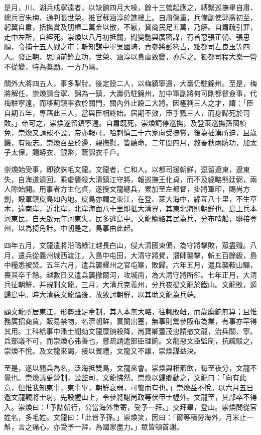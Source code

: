 \begin{pinyinscope}
是月，川、湖兵戍寧遠者，以缺餉四月大噪，餘十三營起應之，縛繫巡撫畢自肅、總兵官朱梅、通判張世榮、推官蘇涵淳於譙樓上。自肅傷重，兵備副使郭廣初至，躬翼自肅，括撫賞及朋椿二萬金以散，不厭，貸商民足五萬，乃解。自肅疏引罪，走中左所，自經死。崇煥以八月初抵關，聞變馳與廣密謀，宥首惡張正朝、張思順，令捕十五人戮之市；斬知謀中軍吳國琦，責參將彭簪古，黜都司左良玉等四人。發正朝、思順前鋒立功，世榮、涵淳以貪虐致變，亦斥之。獨都司程大樂一營不從變，特為獎勵。一方乃靖。

關外大將四五人，事多掣肘。後定設二人，以梅鎮寧遠，大壽仍駐錦州。至是，梅將解任，崇煥請合寧、錦為一鎮，大壽仍駐錦州，加中軍副將何可剛都督僉事，代梅駐寧遠，而移薊鎮率教於關門，關內外止設二大將。因極稱三人之才，謂：「臣自期五年，專藉此三人，當與臣相終始。屆期不效，臣手戮三人，而身歸死於司敗。」帝可之，崇煥遂留鎮寧遠。自肅既死，崇煥請停巡撫，及登萊巡撫孫國楨免，崇煥又請罷不設。帝亦報可。哈剌慎三十六家向受撫賞，後為插漢所迫，且歲饑，有叛志。崇煥召至於邊，親撫慰，皆聽命。二年閏四月，敘春秋兩防功，加太子太保，賜蟒衣、銀幣，蔭錦衣千戶。

崇煥始受事，即欲誅毛文龍。文龍者，仁和人。以都司援朝鮮，逗留遼東，遼東失，自海道遁回，乘虛襲殺大清鎮江守將，報巡撫王化貞，而不及經略熊廷弼，兩人隙始開。用事者方主化貞，遂授文龍總兵，累加至左都督，掛將軍印，賜尚方劍，設軍鎮皮島如內地。皮島亦謂之東江，在登、萊大海中，綿亙八十里，不生草木，遠南岸，近北岸，北岸海面八十里即抵大清界，其東北海則朝鮮也。島上兵本河東民，自天啟元年河東失，民多逃島中。文龍籠絡其民為兵，分布哨船，聯接登州，以為掎角計。中朝是之，島事由此起。

四年五月，文龍遣將沿鴨綠江越長白山，侵大清國東偏，為守將擊敗，眾盡殲。八月，遣兵從義州城西渡江，入島中屯田，大清守將覺，潛師襲擊，斬五百餘級，島中糧悉被焚。五年六月，遣兵襲耀州之官屯寨，敗歸。六年五月，遣兵襲鞍山驛，喪其卒千餘。越數日又遣兵襲撤爾河，攻城南，為大清守將所卻。七年正月，大清兵征朝鮮，并規剿文龍。三月，大清兵克義州，分兵夜搗文龍於鐵山。文龍敗，遁歸島中。時大清惡文龍躡後，故致討朝鮮，以其助文龍為兵端。

顧文龍所居東江，形勢雖足牽制，其人本無大略，往輒敗衄，而歲糜餉無算；且惟務廣招商賈，販易禁物，名濟朝鮮，實闌出塞，無事則鬻參販布為業，有事亦罕得其用。工科給事中潘士聞劾文龍糜餉殺降，尚寶卿董茂忠請撤文龍，治兵關、寧。兵部議不可，而崇煥心弗善也，嘗疏請遣部臣理餉。文龍惡文臣監制，抗疏駁之，崇煥不悅。及文龍來謁，接以賓禮，文龍又不讓，崇煥謀益決。

至是，遂以閱兵為名，泛海抵雙島，文龍來會。崇煥與相燕飲，每至夜分，文龍不覺也。崇煥議更營制，設監司，文龍怫然。崇煥以歸鄉動之，文龍曰：「向有此意，但惟我知東事，東事畢，朝鮮衰弱，可襲而有也。」崇煥益不悅。以六月五日邀文龍觀將士射，先設幄山上，令參將謝尚政等伏甲士幄外。文龍至，其部卒不得入。崇煥曰：「予詰朝行，公當海外重寄，受予一拜。」交拜畢，登山。崇煥問從官姓名，多毛姓。文龍曰：「此皆予孫。」崇煥笑，因曰：「爾等積勞海外，月米止一斛，言之痛心，亦受予一拜，為國家盡力。」眾皆頓首謝。


\end{pinyinscope}

